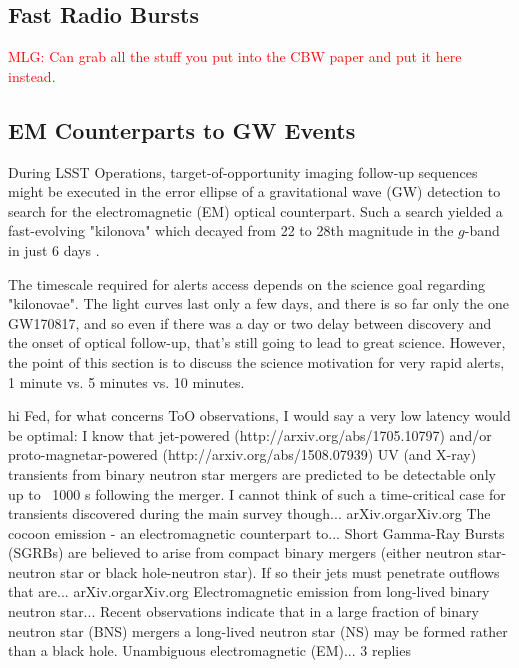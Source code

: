 \documentclass[DM,lsstdraft,authoryear,toc]{lsstdoc}
\begin{document}
\subsection{Fast Radio Bursts}\label{ssec:latency_frb}

\textcolor{red}{MLG: Can grab all the stuff you put into the CBW paper and put it here instead.}


\subsection{EM Counterparts to GW Events}\label{ssec:latency_emgw}

During LSST Operations, target-of-opportunity imaging follow-up sequences might be executed in the error ellipse of a gravitational wave (GW) detection to search for the electromagnetic (EM) optical counterpart. Such a search yielded a fast-evolving "kilonova" which decayed from 22 to 28th magnitude in the $g$-band in just 6 days \citep[faster in the bluer and slower in the redder filters][]{2017Sci...358.1559K}.

The timescale required for alerts access depends on the science goal regarding "kilonovae". The light curves last only a few days, and there is so far only the one GW170817, and so even if there was a day or two delay between discovery and the onset of optical follow-up, that's still going to lead to great science. However, the point of this section is to discuss the science motivation for very rapid alerts, 1 minute vs. 5 minutes vs. 10 minutes.



hi Fed, for what concerns ToO observations, I would say a very low latency would be optimal: I know that jet-powered (http://arxiv.org/abs/1705.10797) and/or proto-magnetar-powered (http://arxiv.org/abs/1508.07939) UV (and X-ray) transients from binary neutron star mergers are predicted to be detectable only up to ~1000 s following the merger. I cannot think of such a time-critical case for transients discovered during the main survey though...
arXiv.orgarXiv.org
The cocoon emission - an electromagnetic counterpart to...
Short Gamma-Ray Bursts (SGRBs) are believed to arise from compact binary mergers (either neutron star-neutron star or black hole-neutron star). If so their jets must penetrate outflows that are...
arXiv.orgarXiv.org
Electromagnetic emission from long-lived binary neutron star...
Recent observations indicate that in a large fraction of binary neutron star (BNS) mergers a long-lived neutron star (NS) may be formed rather than a black hole. Unambiguous electromagnetic (EM)...
3 replies
\end{document}

